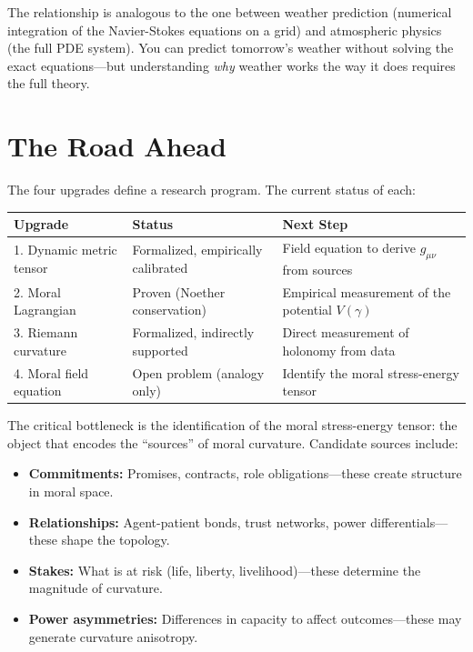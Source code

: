 \documentclass[12pt,letterpaper]{article}
\theoremstyle{definition}
\begin{document}
The relationship is analogous to the one between weather prediction (numerical integration of the Navier-Stokes equations on a grid) and atmospheric physics (the full PDE system). You can predict tomorrow's weather without solving the exact equations---but understanding \emph{why} weather works the way it does requires the full theory.


\section{The Road Ahead}
\label{sec:roadmap}

The four upgrades define a research program. The current status of each:

\begin{center}
\begin{tabular}{llp{6cm}}
\toprule
\textbf{Upgrade} & \textbf{Status} & \textbf{Next Step} \\
\midrule
1. Dynamic metric tensor & Formalized, empirically calibrated & Field equation to derive $g_{\mu\nu}$ from sources \\
2. Moral Lagrangian & Proven (Noether conservation) & Empirical measurement of the potential $V(\gamma)$ \\
3. Riemann curvature & Formalized, indirectly supported & Direct measurement of holonomy from data \\
4. Moral field equation & Open problem (analogy only) & Identify the moral stress-energy tensor \\
\bottomrule
\end{tabular}
\end{center}

The critical bottleneck is the identification of the moral stress-energy tensor: the object that encodes the ``sources'' of moral curvature. Candidate sources include:

\begin{itemize}
    \item \textbf{Commitments:} Promises, contracts, role obligations---these create structure in moral space.
    \item \textbf{Relationships:} Agent-patient bonds, trust networks, power differentials---these shape the topology.
    \item \textbf{Stakes:} What is at risk (life, liberty, livelihood)---these determine the magnitude of curvature.
    \item \textbf{Power asymmetries:} Differences in capacity to affect outcomes---these may generate curvature anisotropy.
\end{itemize}
\end{document}
